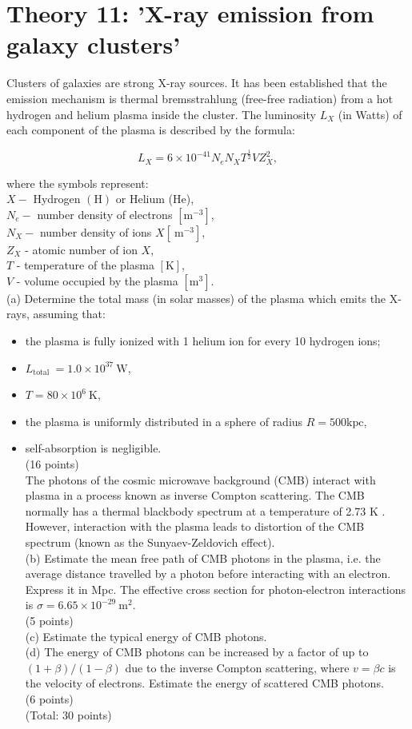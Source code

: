 \documentclass[10pt]{article}
\begin{document}
\section*{Theory 11: 'X-ray emission from galaxy clusters'}
Clusters of galaxies are strong X-ray sources. It has been established that the emission mechanism is thermal bremsstrahlung (free-free radiation) from a hot hydrogen and helium plasma inside the cluster. The luminosity $L_{X}$ (in Watts) of each component of the plasma is described by the formula:

$$
L_{X}=6 \times 10^{-41} N_{e} N_{X} T^{\frac{1}{2}} V Z_{X}^{2},
$$

where the symbols represent:\\
$X-$ Hydrogen $(\mathrm{H})$ or Helium (He),\\
$N_{e}-$ number density of electrons $\left[\mathrm{m}^{-3}\right]$,\\
$N_{X}-$ number density of ions $X\left[\mathrm{~m}^{-3}\right]$,\\
$Z_{X}$ - atomic number of ion $X$,\\
$T$ - temperature of the plasma $[\mathrm{K}]$,\\
$V$ - volume occupied by the plasma $\left[\mathrm{m}^{3}\right]$.\\
(a) Determine the total mass (in solar masses) of the plasma which emits the X-rays, assuming that:

\begin{itemize}
  \item the plasma is fully ionized with 1 helium ion for every 10 hydrogen ions;
  \item $L_{\text {total }}=1.0 \times 10^{37} \mathrm{~W}$,
  \item $T=80 \times 10^{6} \mathrm{~K}$,
  \item the plasma is uniformly distributed in a sphere of radius $R=500 \mathrm{kpc}$,
  \item self-absorption is negligible.\\
(16 points)\\
The photons of the cosmic microwave background (CMB) interact with plasma in a process known as inverse Compton scattering. The CMB normally has a thermal blackbody spectrum at a temperature of 2.73 K . However, interaction with the plasma leads to distortion of the CMB spectrum (known as the Sunyaev-Zeldovich effect).\\
(b) Estimate the mean free path of CMB photons in the plasma, i.e. the average distance travelled by a photon before interacting with an electron. Express it in Mpc. The effective cross section for photon-electron interactions is $\sigma=6.65 \times 10^{-29} \mathrm{~m}^{2}$.\\
(5 points)\\
(c) Estimate the typical energy of CMB photons.\\
(d) The energy of CMB photons can be increased by a factor of up to $(1+\beta) /(1-\beta)$ due to the inverse Compton scattering, where $v=\beta c$ is the velocity of electrons. Estimate the energy of scattered CMB photons.\\
(6 points)\\
(Total: 30 points)
\end{itemize}
\end{document}
